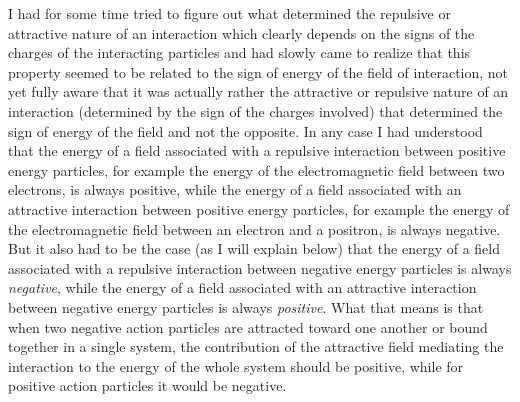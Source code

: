 \documentclass[notitlepage,12pt]{report}
\begin{document}
I had for some time tried to figure out what determined the repulsive or attractive nature of an interaction which clearly depends on the signs of the charges of the interacting particles and had slowly came to realize that this property seemed to be related to the sign of energy of the field of interaction, not yet fully aware that it was actually rather the attractive or repulsive nature of an interaction (determined by the sign of the charges involved) that determined the sign of energy of the field and not the opposite. In any case I had understood that the energy of a field associated with a repulsive interaction between positive energy particles, for example the energy of the electromagnetic field between two electrons, is always positive, while the energy of a field associated with an attractive interaction between positive energy particles, for example the energy of the electromagnetic field between an electron and a positron, is always negative. But it also had to be the case (as I will explain below) that the energy of a field associated with a repulsive interaction between negative energy particles is always \textit{negative}, while the energy of a field associated with an attractive interaction between negative energy particles is always \textit{positive}. What that means is that when two negative action particles are attracted toward one another or bound together in a single system, the contribution of the attractive field mediating the interaction to the energy of the whole system should be positive, while for positive action particles it would be negative.
\end{document}
